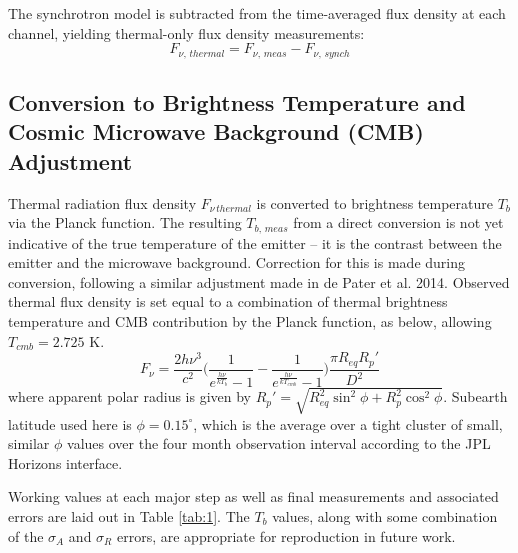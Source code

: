 \documentclass{article}
\newcommand{\expon}[1]{e^{#1}}
\begin{document}
	The synchrotron model is subtracted from the time-averaged flux density at each channel, yielding thermal-only flux density measurements:
	$$F_{\nu,\,thermal} = F_{\nu,\,meas} - F_{\nu,\,synch}$$


\subsection{Conversion to Brightness Temperature and Cosmic Microwave Background (CMB) Adjustment} %
	
	Thermal radiation flux density $F_{\nu\,thermal}$ is converted to brightness temperature $T_b$ via the Planck function.
	The resulting $T_{b,\,meas}$ from a direct conversion is not yet indicative of the true temperature of the emitter -- it is the contrast between the emitter and the microwave background.
	Correction for this is made during conversion, following a similar adjustment made in de Pater et al. 2014.
	Observed thermal flux density is set equal to a combination of thermal brightness temperature and CMB contribution by the Planck function, as below, allowing $T_{cmb} = 2.725$ K.
	$$ F_{\nu} = \frac{2h\nu^3}{c^2}\Bigg( \frac{1}{\expon{\frac{h\nu}{kT_b}} - 1} - \frac{1}{\expon{\frac{h\nu}{kT_{cmb}}} - 1} \Bigg)
		\frac{\pi R_{eq} R_{p}'}{D^2} $$
	where apparent polar radius is given by $R_{p}' = \sqrt{R_{eq}^{2}\sin^{2}{\phi} + R_{p}^{2}\cos^{2}{\phi}}$.
	Subearth latitude used here is $\phi = 0.15^{\circ}$, which is the average over a tight cluster of
	small, similar $\phi$ values over the four month observation interval according to the JPL Horizons interface.

	Working values at each major step as well as final measurements and associated errors are laid out in Table \ref{tab:1}.
	The $T_b$ values, along with some combination of the $\sigma_{A}$ and $\sigma_{R}$ errors, are appropriate for reproduction in future work.
\end{document}
